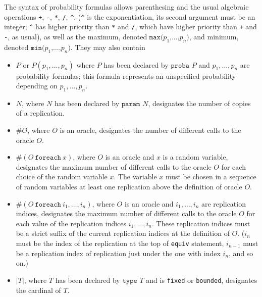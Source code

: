 The syntax of probability formulas allows parenthesing and the usual
algebraic operations \texttt{+}, \texttt{-}, \texttt{*}, \texttt{/}, \texttt{\^{ }}.
(\texttt{\^{ }} is the exponentiation, its second argument must be an integer; 
\texttt{\^{ }} has higher priority than \texttt{*} and \texttt{/}, 
which have higher priority than \texttt{+} and
\texttt{-}, as usual), as well as the maximum, denoted 
$\texttt{max(}p_1\texttt{,}\ldots\texttt{,}p_n\texttt{)}$, and
minimum, denoted $\texttt{min(}p_1\texttt{,}\ldots\texttt{,}p_n\texttt{)}$. 
They may also contain 
\begin{itemize}

\item $P$ or $P(p_1, \ldots,
p_n)$ where $P$ has been declared by $\texttt{proba }P$ and $p_1,
\ldots, p_n$ are probability formulas; this formula represents an
unspecified probability depending on $p_1, \ldots, p_n$. 

\item $N$, where $N$ has been declared by $\texttt{param }N$,
designates the number of copies of a replication.

\item $\#O$, where $O$ is an oracle,
designates the number of different calls to the oracle $O$. 

\item $\#(O\ \texttt{foreach}\ x)$, where $O$ is an oracle and $x$ is
  a random variable, designates the maximum number of different calls
  to the oracle $O$ for each choice of the random variable $x$.
  The variable $x$ must be chosen in a sequence of random variables
  at least one replication above the definition of oracle $O$.

\item $\#(O\ \texttt{foreach}\ i_1, \dots, i_n)$, where $O$ is an
  oracle and $i_1, \dots, i_n$ are replication indices, designates the
  maximum number of different calls to the oracle $O$ for each value
  of the replication indices $i_1, \dots, i_n$. These replication
  indices must be a strict suffix of the current replication indices
  at the definition of $O$. ($i_n$ must be the index of the
  replication at the top of \texttt{equiv} statement, $i_{n-1}$ must
  be a replication index of replication just under the one with index
  $i_n$, and so on.)

\item $|T|$, where
$T$ has been declared by $\texttt{type }T$ and is \texttt{fixed}
or \texttt{bounded}, designates the cardinal of $T$.


\end{itemize}
